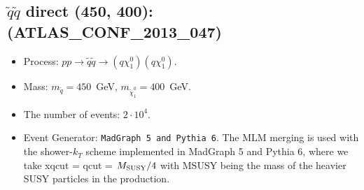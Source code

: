 \documentclass[12pt]{article}
\begin{document}
    
\subsection{$\tilde q \tilde q$ direct (450, 400): (ATLAS\_CONF\_2013\_047)} 


        \begin{itemize}
        \item  Process: $pp \to \tilde q \tilde q \to (q \chi_1^0)(q \chi_1^0)$.
        \item  Mass: $m_{\tilde q} = 450$~GeV, $m_{\tilde \chi_1^0} = 400$~GeV.
        \item  The number of events: $2 \cdot 10^4$.
        \item  Event Generator: {\tt MadGraph 5 and Pythia 6}.
                The MLM merging is used with the shower-$k_T$ scheme implemented in MadGraph 5 and Pythia 6, where we take xqcut = qcut = $M_{\rm SUSY}/4$ with MSUSY being the mass of the heavier SUSY particles in the production.      
        \end{itemize}    
    
\end{document}

